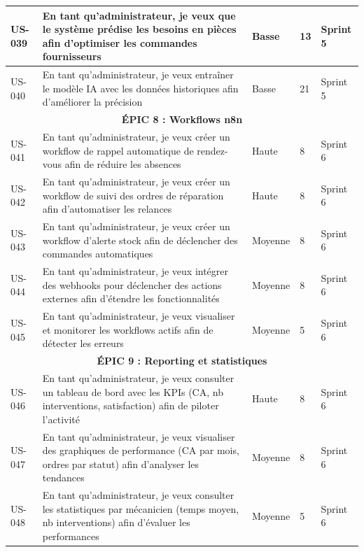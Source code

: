 \begin{longtable}{|p{1cm}|p{5.5cm}|p{1.8cm}|p{1.5cm}|p{1.5cm}|}
US-039 & En tant qu'administrateur, je veux que le système prédise les besoins en pièces afin d'optimiser les commandes fournisseurs & Basse & 13 & Sprint 5 \\
\hline

US-040 & En tant qu'administrateur, je veux entraîner le modèle IA avec les données historiques afin d'améliorer la précision & Basse & 21 & Sprint 5 \\
\hline

\multicolumn{5}{|c|}{\cellcolor{gray!20}\textbf{ÉPIC 8 : Workflows n8n}} \\
\hline

US-041 & En tant qu'administrateur, je veux créer un workflow de rappel automatique de rendez-vous afin de réduire les absences & Haute & 8 & Sprint 6 \\
\hline

US-042 & En tant qu'administrateur, je veux créer un workflow de suivi des ordres de réparation afin d'automatiser les relances & Haute & 8 & Sprint 6 \\
\hline

US-043 & En tant qu'administrateur, je veux créer un workflow d'alerte stock afin de déclencher des commandes automatiques & Moyenne & 8 & Sprint 6 \\
\hline

US-044 & En tant qu'administrateur, je veux intégrer des webhooks pour déclencher des actions externes afin d'étendre les fonctionnalités & Moyenne & 8 & Sprint 6 \\
\hline

US-045 & En tant qu'administrateur, je veux visualiser et monitorer les workflows actifs afin de détecter les erreurs & Moyenne & 5 & Sprint 6 \\
\hline

\multicolumn{5}{|c|}{\cellcolor{gray!20}\textbf{ÉPIC 9 : Reporting et statistiques}} \\
\hline

US-046 & En tant qu'administrateur, je veux consulter un tableau de bord avec les KPIs (CA, nb interventions, satisfaction) afin de piloter l'activité & Haute & 8 & Sprint 6 \\
\hline

US-047 & En tant qu'administrateur, je veux visualiser des graphiques de performance (CA par mois, ordres par statut) afin d'analyser les tendances & Moyenne & 8 & Sprint 6 \\
\hline

US-048 & En tant qu'administrateur, je veux consulter les statistiques par mécanicien (temps moyen, nb interventions) afin d'évaluer les performances & Moyenne & 5 & Sprint 6 \\
\hline


\end{longtable}
